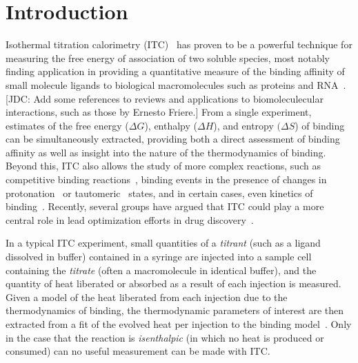 \documentclass[aps,pre,twocolumn,nofootinbib,superscriptaddress,linenumbers]{revtex4-1}
\begin{document}
\section{Introduction}
\label{section:introduction}

Isothermal titration calorimetry (ITC)~\cite{wiseman:anal-biochem:1989:itc} has proven to be a powerful technique for measuring the free energy of association of two soluble species, most notably finding application in providing a quantitative measure of the binding affinity of small molecule ligands to biological macromolecules such as proteins and RNA~\cite{freire:curr-opin-struct-biol:2001:itc,salim-feig:methods:2009:itc-rna}.
{\color{red} [JDC: Add some references to reviews and applications to biomoleculecular interactions, such as those by Ernesto Friere.]}
From a single experiment, estimates of the free energy ($\Delta G$), enthalpy ($\Delta H$), and entropy $(\Delta S$) of binding can be simultaneously extracted, providing both a direct assessment of binding affinity as well as insight into the nature of the thermodynamics of binding.
Beyond this, ITC also allows the study of more complex reactions, such as competitive binding reactions~\cite{freire:arch-biochem-biophys:2001,freire:curr-opin-struct-biol:2001:itc}, binding events in the presence of changes in protonation~\cite{klebe:2007:jmb:protonation-state-trypsin,klebe:2007:jmb:protonation-state} or tautomeric~\cite{han:2007:biophys-chem:itc-tautomers} states, and in certain cases, even kinetics of binding~\cite{bonini:jpcb:2008:kinetics-from-itc}.
Recently, several groups have argued that ITC could play a more central role in lead optimization efforts in drug discovery~\cite{freire:drug-discovery-today:2008:entropy-enthalpy,freire:nat-rev-drug-discovery:2010:itc-lead-optimization}.

In a typical ITC experiment, small quantities of a \emph{titrant} (such as a ligand dissolved in buffer) contained in a syringe are injected into a sample cell containing the \emph{titrate} (often a macromolecule in identical buffer), and the quantity of heat liberated or absorbed as a result of each injection is measured.
Given a model of the heat liberated from each injection due to the thermodynamics of binding, the thermodynamic parameters of interest are then extracted from a fit of the evolved heat per injection to the binding model~\cite{wiseman:anal-biochem:1989:itc}.
Only in the case that the reaction is \emph{isenthalpic} (in which no heat is produced or consumed) can no useful measurement can be made with ITC.
\end{document}
